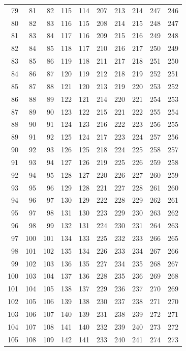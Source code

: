 \begin{longtable}{rrrrr@{\qquad}rrrrr}
79 & 81 & 82 & 115 & 114 & 207 & 213 & 214 & 247 & 246 \\
80 & 82 & 83 & 116 & 115 & 208 & 214 & 215 & 248 & 247 \\
81 & 83 & 84 & 117 & 116 & 209 & 215 & 216 & 249 & 248 \\
82 & 84 & 85 & 118 & 117 & 210 & 216 & 217 & 250 & 249 \\
83 & 85 & 86 & 119 & 118 & 211 & 217 & 218 & 251 & 250 \\
84 & 86 & 87 & 120 & 119 & 212 & 218 & 219 & 252 & 251 \\
85 & 87 & 88 & 121 & 120 & 213 & 219 & 220 & 253 & 252 \\
86 & 88 & 89 & 122 & 121 & 214 & 220 & 221 & 254 & 253 \\
87 & 89 & 90 & 123 & 122 & 215 & 221 & 222 & 255 & 254 \\
88 & 90 & 91 & 124 & 123 & 216 & 222 & 223 & 256 & 255 \\
89 & 91 & 92 & 125 & 124 & 217 & 223 & 224 & 257 & 256 \\
90 & 92 & 93 & 126 & 125 & 218 & 224 & 225 & 258 & 257 \\
91 & 93 & 94 & 127 & 126 & 219 & 225 & 226 & 259 & 258 \\
92 & 94 & 95 & 128 & 127 & 220 & 226 & 227 & 260 & 259 \\
93 & 95 & 96 & 129 & 128 & 221 & 227 & 228 & 261 & 260 \\
94 & 96 & 97 & 130 & 129 & 222 & 228 & 229 & 262 & 261 \\
95 & 97 & 98 & 131 & 130 & 223 & 229 & 230 & 263 & 262 \\
96 & 98 & 99 & 132 & 131 & 224 & 230 & 231 & 264 & 263 \\
97 & 100 & 101 & 134 & 133 & 225 & 232 & 233 & 266 & 265 \\
98 & 101 & 102 & 135 & 134 & 226 & 233 & 234 & 267 & 266 \\
99 & 102 & 103 & 136 & 135 & 227 & 234 & 235 & 268 & 267 \\
100 & 103 & 104 & 137 & 136 & 228 & 235 & 236 & 269 & 268 \\
101 & 104 & 105 & 138 & 137 & 229 & 236 & 237 & 270 & 269 \\
102 & 105 & 106 & 139 & 138 & 230 & 237 & 238 & 271 & 270 \\
103 & 106 & 107 & 140 & 139 & 231 & 238 & 239 & 272 & 271 \\
104 & 107 & 108 & 141 & 140 & 232 & 239 & 240 & 273 & 272 \\
105 & 108 & 109 & 142 & 141 & 233 & 240 & 241 & 274 & 273 \\

\end{longtable}
